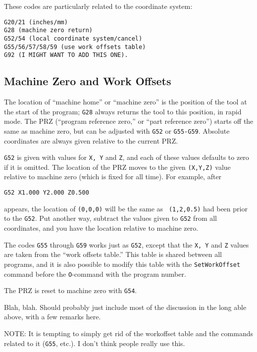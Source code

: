 \documentclass[titlepage,oneside,10pt]{article}
\begin{document}
These codes are particularly related to
the coordinate system:
\begin{verbatim}
G20/21 (inches/mm)
G28 (machine zero return)
G52/54 (local coordinate system/cancel)
G55/56/57/58/59 (use work offsets table)
G92 (I MIGHT WANT TO ADD THIS ONE).
\end{verbatim}

\subsection{Machine Zero and Work Offsets}

The location of ``machine home'' or ``machine zero'' is the position
of the tool at the start of the program; {\tt G28} always returns the
tool to this position, in rapid mode. The PRZ (``program reference
zero,'' or ``part reference zero'') starts off the same as machine 
zero, but can be adjusted with {\tt G52} or {\tt G55-G59}. Absolute
coordinates are always given relative to the current PRZ.

{\tt G52} is given with values for {\tt X, Y} and {\tt Z}, and each of
these values defaults to zero if it is omitted. The location of the
PRZ moves to the given {\tt (X,Y,Z)} value relative to machine zero
(which is fixed for all time). For example, after
\begin{verbatim}
G52 X1.000 Y2.000 Z0.500
\end{verbatim}
appears, the location of {\tt (0,0,0)} will be the same as {\tt
  (1,2,0.5)} had been prior to the {\tt G52}. Put another way,
subtract the values given to {\tt G52} from all coordinates, and you
have the location relative to machine zero.

The codes {\tt G55} through {\tt G59} works just as {\tt G52}, except
that the {\tt X, Y} and {\tt Z} values are taken from the ``work
offsets table.'' This table is shared between all programs, and it is
also possible to modify this table with the {\tt SetWorkOffset}
command before the {\tt O}-command with the program number.

The PRZ is reset to machine zero with {\tt G54}.



\vskip 1cm



Blah, blah. Should probably just include most of the discussion in the
long able above, with a few remarks here.

NOTE: It is tempting to simply get rid of the workoffset table and the
commands related to it ({\tt G55}, etc.). I don't think people really
use this.
\end{document}
